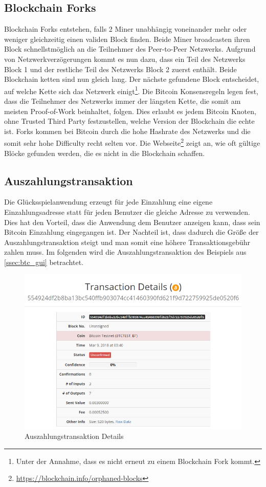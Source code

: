 \subsection{Blockchain Forks} \label{sssec:btc_fork}
Blockchain Forks entstehen, falls 2 Miner unabhängig voneinander mehr oder weniger gleichzeitig einen validen Block finden. Beide Miner broadcasten ihren Block schnellstmöglich an die Teilnehmer des Peer-to-Peer Netzwerks. Aufgrund von Netzwerkverzögerungen kommt es nun dazu, dass ein Teil des Netzwerks Block 1 und der restliche Teil des Netzwerks Block 2 zuerst enthält. Beide Blockchain ketten sind nun gleich lang. Der nächste gefundene Block entscheidet, auf welche Kette sich das Netzwerk einigt\footnote{Unter der Annahme, dass es nicht erneut zu einem Blockchain Fork kommt.}. Die Bitcoin Konsensregeln legen fest, dass die Teilnehmer des Netzwerks immer der längsten Kette, die somit am meisten Proof-of-Work beinhaltet, folgen. Dies erlaubt es jedem Bitcoin Knoten, ohne Trusted Third Party festzustellen, welche Version der Blockchain die echte ist. Forks kommen bei Bitcoin durch die hohe Hashrate des Netzwerks und die somit sehr hohe Difficulty recht selten vor. Die Webseite\footnote{\url{https://blockchain.info/orphaned-blocks}} zeigt an, wie oft gültige Blöcke gefunden werden, die es nicht in die Blockchain schaffen.

\subsection{Auszahlungstransaktion} \label{sssec:Auszahlungstransaktion}
Die Glücksspielanwendung erzeugt für jede Einzahlung eine eigene Einzahlungsadresse statt für jeden Benutzer die gleiche Adresse zu verwenden. Dies hat den Vorteil, dass die Anwendung dem Benutzer anzeigen kann, dass sein Bitcoin Einzahlung eingegangen ist. Der Nachteil ist, dass dadurch die Größe der Auszahlungstransaktion steigt und man somit eine höhere Transaktionsgebühr zahlen muss. Im folgenden wird die Auszahlungstransaktion des Beispiels aus \ref{ssec:btc_gui} betrachtet.

\begin{figure}[H]
\centering
\includegraphics[width=1\linewidth]{Figures/btc_gui/btc_txn}
\decoRule
\caption{Auszahlungstransaktion Details}
\label{fig:btc_txn}
\end{figure}

